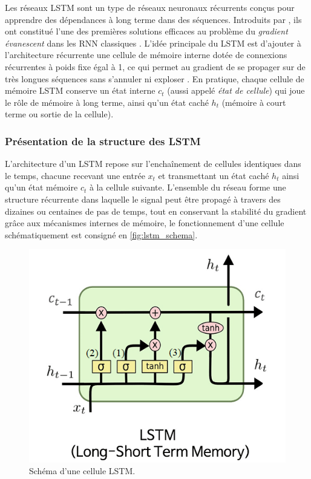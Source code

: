 Les réseaux LSTM sont un type de réseaux neuronaux récurrents conçus pour apprendre des dépendances à long terme dans des séquences. Introduits par \citep{hochreiter1997long}, ils ont constitué l’une des premières solutions efficaces au problème du \textit{gradient évanescent} dans les RNN classiques \citep{hochreiter1997long, d2l2020}. L’idée principale du LSTM est d’ajouter à l’architecture récurrente une cellule de mémoire interne dotée de connexions récurrentes à poids fixe égal à 1, ce qui permet au gradient de se propager sur de très longues séquences sans s’annuler ni exploser \citep{d2l2020}. En pratique, chaque cellule de mémoire LSTM conserve un état interne $c_t$ (aussi appelé \textit{état de cellule}) qui joue le rôle de mémoire à long terme, ainsi qu’un état caché $h_t$ (mémoire à court terme ou sortie de la cellule).

\subsubsection{Présentation de la structure des LSTM}

L’architecture d’un LSTM repose sur l’enchaînement de cellules identiques dans le temps, chacune recevant une entrée $x_t$ et transmettant un état caché $h_t$ ainsi qu’un état mémoire $c_t$ à la cellule suivante. L’ensemble du réseau forme une structure récurrente dans laquelle le signal peut être propagé à travers des dizaines ou centaines de pas de temps, tout en conservant la stabilité du gradient grâce aux mécanismes internes de mémoire, le fonctionnement d'une cellule schématiquement est consigné en \autoref{fig:lstm_schema}.\\

\begin{figure}[H]
    \centering
    \includegraphics[width=0.5\linewidth]{images/lstm_schema.png}
    \caption{Schéma d'une cellule LSTM.}
    \label{fig:lstm_schema}
\end{figure}

